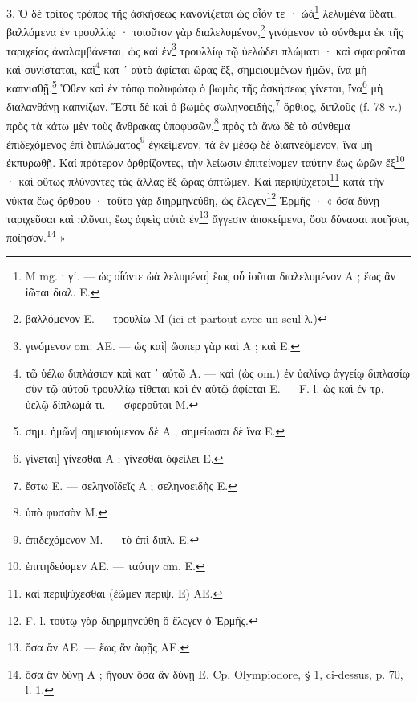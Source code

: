 \documentclass[a4paper, 11pt, oneside, polutonikogreek, french]{article}
\begin{document}
3. Ὁ δὲ τρίτος τρόπος τῆς ἀσκήσεως κανονίζεται ὡς οἷόν τε · ὠὰ\footnote{M mg. : γʹ. --- ὡς οἷόντε ὠὰ λελυμένα] ἕως οὗ ἰοῦται διαλελυμένον A ; ἕως ἂν ἰῶται διαλ. E.} λελυμένα ὕδατι, βαλλόμενα ἐν τρουλλίῳ · τοιοῦτον γὰρ διαλελυμένον,\footnote{βαλλόμενον E. --- τρουλίω M (ici et partout avec un seul λ.)} γινόμενον τὸ σύνθεμα ἐκ τῆς ταριχείας ἀναλαμβάνεται, ὡς καὶ ἐν\footnote{γινόμενον om. AE. --- ὡς καὶ] ὥσπερ γὰρ καὶ A ; καὶ E.} τρουλλίῳ τῷ ὑελώδει πλώματι · καὶ σφαιροῦται καὶ συνίσταται, καὶ\footnote{τῶ ὑέλω διπλάσιον καὶ κατ ᾽ αὐτῶ A. --- καὶ (ὡς om.) ἐν ὑαλίνῳ ἀγγείῳ διπλασίῳ σὺν τῷ αὐτοῦ τρουλλίῳ τίθεται καὶ ἐν αὐτῷ ἀφίεται E. --- F. l. ὡς καὶ ἐν τρ. ὑελῷ δίπλωμά τι. --- σφεροῦται M.} κατ ᾽ αὐτὸ ἀφίεται ὥρας ἓξ, σημειουμένων ἡμῶν, ἵνα μὴ καπνισθῇ.\footnote{σημ. ἡμῶν] σημειούμενον δὲ A ; σημείωσαι δὲ ἵνα E.} Ὅθεν καὶ ἐν τόπῳ πολυφώτῳ ὁ βωμὸς τῆς ἀσκήσεως γίνεται, ἵνα\footnote{γίνεται] γίνεσθαι A ; γίνεσθαι ὀφείλει E.} μὴ διαλανθάνῃ καπνίζων. Ἔστι δὲ καὶ ὁ βωμὸς σωληνοειδὴς,\footnote{ἔστω E. --- σεληνοϊδεῖς A ; σεληνοειδὴς E.} ὄρθιος, διπλοῦς (f. 78 v.) πρὸς τὰ κάτω μὲν τοὺς ἄνθρακας ὑποφυσῶν,\footnote{ὑπὸ φυσσὸν M.} πρὸς τὰ ἄνω δὲ τὸ σύνθεμα ἐπιδεχόμενος ἐπὶ διπλώματος\footnote{ἐπιδεχόμενον M. --- τὸ ἐπὶ διπλ. E.} ἐγκείμενον, τὰ ἐν μέσῳ δὲ διαπνεόμενον, ἵνα μὴ ἐκπυρωθῇ. Καί πρότερον ὀρθρίζοντες, τὴν λείωσιν ἐπιτείνομεν ταύτην ἕως ὡρῶν ἕξ\footnote{ἐπιτηδεύομεν AE. --- ταύτην om. E.} · καὶ οὕτως πλύνοντες τὰς ἄλλας ἓξ ὥρας ὀπτῶμεν. Καὶ περιψύχεται\footnote{καὶ περιψύχεσθαι (ἐῶμεν περιψ. E) AE.} κατὰ τὴν νύκτα ἕως ὄρθρου · τοῦτο γὰρ διηρμηνεύθη, ὡς ἔλεγεν\footnote{F. l. τούτῳ γὰρ διηρμηνεύθη ὃ ἔλεγεν ὁ Ἑρμῆς.} Ἑρμῆς · « ὅσα δύνῃ ταριχεῦσαι καὶ πλῦναι, ἕως ἀφεὶς αὐτὰ ἐν\footnote{ὅσα ἂν AE. --- ἕως ἂν ἀφῇς AE.} ἄγγεσιν ἀποκείμενα, ὅσα δύνασαι ποιῆσαι, ποίησον.\footnote{ὅσα ἂν δύνῃ A ; ἤγουν ὅσα ἂν δύνῃ E. Cp. Olympiodore, § 1, ci-dessus, p. 70, l. 1.} »
\end{document}
